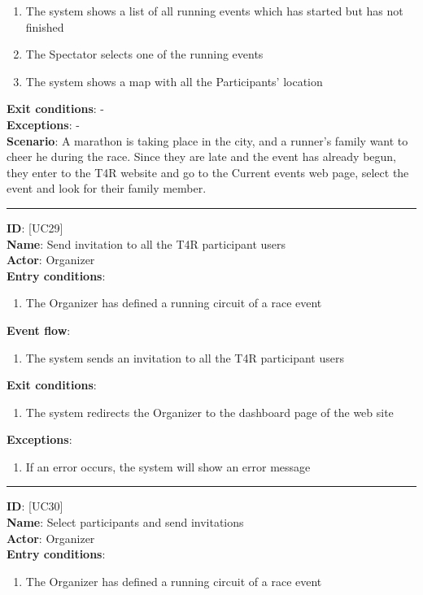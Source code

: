 \documentclass[a4paper, hidelinks, 12pt]{report}
\newcommand\usecase[1]{ [UC#1] }
\begin{document}
\begin{itemize}
\begin{enumerate}
			\item{The system shows a list of all running events which has started but has not finished}
			\item{The Spectator selects one of the running events}
			\item{The system shows a map with all the Participants' location}
		\end{enumerate}
		\textbf{Exit conditions}: - \\
		\textbf{Exceptions}: - \\
		\textbf{Scenario}: A marathon is taking place in the city, and a runner's family want to cheer he during the race. Since they are late and the event has already begun, they enter to the T4R website and go to the Current events web page, select the event and look for their family member. \\
		\rule{\linewidth}{0.4pt}
		\textbf{ID}: \usecase{29} \\
		\textbf{Name}: Send invitation to all the T4R participant users \\
		\textbf{Actor}: Organizer \\
		\textbf{Entry conditions}:
		\begin{enumerate}
			\item{The Organizer has defined a running circuit of a race event}
		\end{enumerate}
		\textbf{Event flow}:
		\begin{enumerate}
			\item{The system sends an invitation to all the T4R participant users}
		\end{enumerate}
		\textbf{Exit conditions}:
		\begin{enumerate}
			\item{The system redirects the Organizer to the dashboard page of the web site}
		\end{enumerate}
		\textbf{Exceptions}:
		\begin{enumerate}
			\item{If an error occurs, the system will show an error message}
		\end{enumerate}
		\rule{\linewidth}{0.4pt}
		\textbf{ID}: \usecase{30} \\
		\textbf{Name}: Select participants and send invitations \\
		\textbf{Actor}: Organizer \\
		\textbf{Entry conditions}:
		\begin{enumerate}
			\item{The Organizer has defined a running circuit of a race event}

\end{enumerate}
\end{itemize}
\end{document}
